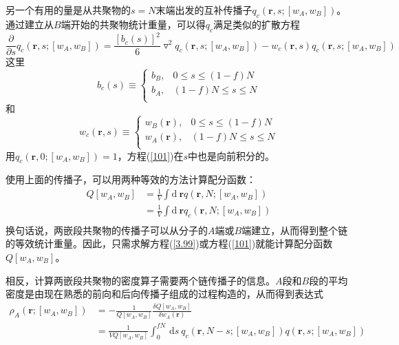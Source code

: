 另一个有用的量是从共聚物的$s=N$末端出发的互补传播子$q_c(\mathbf{r},s;[w_A,w_B])$。通过建立从$B$端开始的共聚物统计重量，可以得$q_c$满足类似的扩散方程
\begin{equation}
\frac{\partial}{\partial s}q_c(\mathbf{r},s;[w_A,w_B])=\frac{[b_c(s)]^2}{6}\triangledown ^2q_c(\mathbf{r},s;[w_A,w_B])-w_c(\mathbf{r},s)q_c(\mathbf{r},s;[w_A,w_B]) \label{101}
\end{equation}
这里
\begin{equation}
b_c (s)\equiv
\begin{cases}
b_B, & 0\leq s \leq (1-f)N \\
b_A, & (1-f)N \leq s \leq N\\
\end{cases}
\end{equation}
和
\begin{equation}
w_c (\mathbf{r},s)\equiv
\begin{cases}
w_B(\mathbf{r}), & 0\leq s \leq (1-f)N \\
w_A(\mathbf{r}), & (1-f)N \leq s \leq N\\
\end{cases}
\end{equation}
用$q_c(\mathbf{r},0;[w_A,w_B])=1$，方程(\ref{101})在$s$中也是向前积分的。		

使用上面的传播子，可以用两种等效的方法计算配分函数：
\begin{equation}
\begin{aligned}
Q[w_A,w_B] & = \frac{1}{V}\int \mathrm{d}~\mathbf{r}q(\mathbf{r},N;[w_A,w_B]) \\
&=\frac{1}{V}\int \mathrm{d}~\mathbf{r}q_c(\mathbf{r},N;[w_A,w_B]) \\
\end{aligned}	
\end{equation}
换句话说，两嵌段共聚物的传播子可以从分子的$A$端或$B$端建立，从而得到整个链的等效统计重量。因此，只需求解方程(\ref{3.99})或方程(\ref{101})就能计算配分函数$Q[w_A,w_B]$。

相反，计算两嵌段共聚物的密度算子需要两个链传播子的信息。$A$段和$B$段的平均密度是由现在熟悉的前向和后向传播子组成的过程构造的，从而得到表达式
\begin{equation}
\begin{aligned}
\rho _A(\mathbf{r};[w_A,w_B]) & =-\frac{1}{Q[w_A,w_B]}	\frac{\delta Q[w_A,w_B]}{\delta w_A(\mathbf{r})} \\
& =\frac{1}{VQ[w_A,w_B]} \int _{0}^{fN}\,\mathrm{d}s~q_c(\mathbf{r},N-s;[w_A,w_B])q(\mathbf{r},s;[w_A,w_B]) \\
\end{aligned}	
\end{equation}

